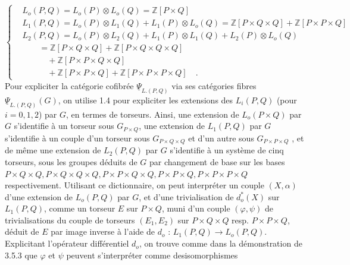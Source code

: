 \begin{equation}\tag{3.6.6}
\left\{
\begin{aligned}
&L_o(P,Q) = L_o(P) \otimes L_o(Q) = \mathbb{Z}[P\times Q] \\
&L_1(P,Q) = L_o(P) \otimes L_1(Q) + L_1(P) \otimes L_o(Q) = \mathbb{Z}[P\times Q\times Q] + \mathbb{Z}[P\times P\times Q] \\
&L_2(P,Q) = L_o(P) \otimes L_2(Q) + L_1(P) \otimes L_1(Q) + L_2(P) \otimes L_o(Q) \\
&\qquad = \mathbb{Z}[P\times Q\times Q] + \mathbb{Z}[P\times Q\times Q\times Q] \\
&\qquad\quad + \mathbb{Z}[P\times P\times Q\times Q] \\
&\qquad\quad + \mathbb{Z}[P\times P\times Q] + \mathbb{Z}[P\times P\times P\times Q] \quad .
\end{aligned}
\right.
\end{equation}
Pour expliciter la catégorie cofibrée $\underline{\Psi}_{L.(P,Q)}$ via ses catégories fibres $\underline{\Psi}_{L.(P,Q)}(G)$, on utilise 1.4 pour expliciter les extensions des $L_i(P,Q)$ (pour $i=0,1,2$) par $G$, en termes de torseurs. Ainsi, une extension de $L_o(P\times Q)$ par $G$ s'identifie à un torseur sous $G_{P\times Q}$, une extension de $L_1(P,Q)$ par $G$ s'identifie à un couple d'un torseur sous $G_{P\times Q\times Q}$ et d'un autre sous $G_{P\times P\times Q}$ , et de même une extension de $L_2(P,Q)$ par $G$ s'identifie à un système de cinq torseurs, sous les groupes déduits de $G$ par changement de base sur les bases $P\times Q\times Q, P\times Q\times Q\times Q, P\times P\times Q\times Q, P\times P\times Q, P\times P\times P\times Q$ respectivement. Utilisant ce dictionnaire, on peut interpréter un couple $(X,\alpha)$ d'une extension de $L_o(P,Q)$ par $G$, et d'une trivialisation de $d_o^*(X)$ sur $L_1(P,Q)$, comme un torseur $E$ sur $P\times Q$, muni d'un couple $(\varphi,\psi)$ de trivialisations du couple de torseurs $(E_1,E_2)$ sur $P\times Q\times Q$ resp. $P\times P\times Q$, déduit de $E$ par image inverse
à l'aide de $d_o$ : $L_1(P,Q) \longrightarrow L_o(P,Q)$. Explicitant l'opérateur différentiel $d_o$, on trouve comme dans la démonstration de 3.5.3 que $\varphi$ et $\psi$ peuvent s'interpréter comme desisomorphismes

